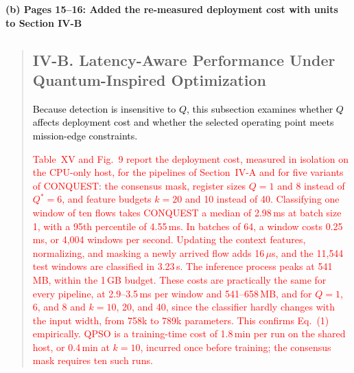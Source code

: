 \documentclass[11pt]{article}
\newenvironment{excerpt}{\begin{quote}\sloppy}{\end{quote}}
\newcommand{\mshead}[2]{\subsection*{\textbf{#1. #2}}}
\newcommand{\loc}[1]{\par\medskip\noindent\textbf{#1}\par}
\begin{document}
\loc{(b) Pages 15--16: Added the re-measured deployment cost with units to Section IV-B}
\begin{excerpt}
\mshead{IV-B}{Latency-Aware Performance Under Quantum-Inspired Optimization}


\textcolor{black}{Because detection is insensitive to $Q$,
this subsection examines whether $Q$ affects deployment cost and
whether the selected operating point meets mission-edge
constraints.}

\textcolor{red}{Table~XV
and Fig.~9 report the deployment cost, measured in
isolation on the CPU-only host, for the pipelines of
Section~IV-A and for five variants of
CONQUEST: the consensus mask, register sizes $Q=1$ and 8 instead of
$Q^{*}=6$, and feature budgets $k=20$ and 10 instead of 40. Classifying one window of ten flows
takes CONQUEST a median of 2.98\,ms at batch size 1, with a 95th
percentile of 4.55\,ms. In batches of 64, a window costs 0.25\,ms, or
4{,}004 windows per second. Updating the context features,
normalizing, and masking a newly arrived flow adds 16\,$\mu$s, and the
11{,}544 test windows are classified in 3.23\,s. The inference process
peaks at 541\,MB, within the 1\,GB budget. These costs are practically
the same for every pipeline, at 2.9--3.5\,ms per window and
541--658\,MB, and for $Q=1$, 6, and 8 and $k=10$, 20, and 40, since
the classifier hardly changes with the input width, from 758k to 789k
parameters. This confirms Eq.~(1) empirically. QPSO is a
training-time cost of 1.8\,min per run on the shared host, or
0.4\,min at $k=10$, incurred once before training; the consensus mask
requires ten such runs.}
\end{excerpt}
\setcounter{table}{14}
\end{document}

